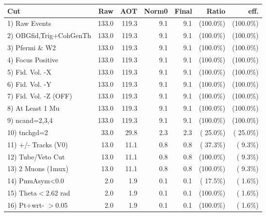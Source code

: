  \begin{table}[h!]\centering
 \begin{tabular}{||l||r|r|r|r|r|r||}
 \hline
 \hline
 Cut & Raw & AOT & Norm0 & Final & Ratio & eff.       \\
 \hline
  1) Raw Events           &        133.0 &        119.3 &          9.1 &          9.1 & (100.0\%) & (100.0\%) \\
  2) OBGfid,Trig+CohGenTh &        133.0 &        119.3 &          9.1 &          9.1 & (100.0\%) & (100.0\%) \\
  3) Pfermi \& W2         &        133.0 &        119.3 &          9.1 &          9.1 & (100.0\%) & (100.0\%) \\
  4) Focus Positive       &        133.0 &        119.3 &          9.1 &          9.1 & (100.0\%) & (100.0\%) \\
  5) Fid. Vol. -X         &        133.0 &        119.3 &          9.1 &          9.1 & (100.0\%) & (100.0\%) \\
  6) Fid. Vol. -Y         &        133.0 &        119.3 &          9.1 &          9.1 & (100.0\%) & (100.0\%) \\
  7) Fid. Vol. -Z (OFF)   &        133.0 &        119.3 &          9.1 &          9.1 & (100.0\%) & (100.0\%) \\
  8) At Least 1 Mu        &        133.0 &        119.3 &          9.1 &          9.1 & (100.0\%) & (100.0\%) \\
  9) ncand=2,3,4          &        133.0 &        119.3 &          9.1 &          9.1 & (100.0\%) & (100.0\%) \\
 10) tnchgd=2             &         33.0 &         29.8 &          2.3 &          2.3 & ( 25.0\%) & ( 25.0\%) \\
 11) +/- Tracks (V0)      &         13.0 &         11.1 &          0.8 &          0.8 & ( 37.3\%) & (  9.3\%) \\
 12) Tube/Veto Cut        &         13.0 &         11.1 &          0.8 &          0.8 & (100.0\%) & (  9.3\%) \\
 13) 2 Muons (1mux)       &         13.0 &         11.1 &          0.8 &          0.8 & (100.0\%) & (  9.3\%) \\
 14) PmuAsym<0.0          &          2.0 &          1.9 &          0.1 &          0.1 & ( 17.5\%) & (  1.6\%) \\
 15) Theta$<$2.62 rad     &          2.0 &          1.9 &          0.1 &          0.1 & (100.0\%) & (  1.6\%) \\
 16) Pt+wrt- $>$0.05      &          2.0 &          1.9 &          0.1 &          0.1 & (100.0\%) & (  1.6\%) \\

\end{tabular}
\end{table}
